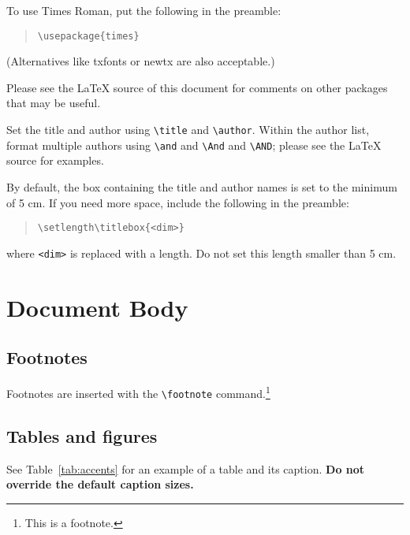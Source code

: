 \documentclass[11pt]{article}
\begin{document}
To use Times Roman, put the following in the preamble:
\begin{quote}
  \begin{verbatim}
\usepackage{times}
\end{verbatim}
\end{quote}
(Alternatives like txfonts or newtx are also acceptable.)

Please see the \LaTeX{} source of this document for comments on other packages that may be useful.

Set the title and author using \verb|\title| and \verb|\author|. Within the author list, format multiple authors using \verb|\and| and \verb|\And| and \verb|\AND|; please see the \LaTeX{} source for examples.

By default, the box containing the title and author names is set to the minimum of 5 cm. If you need more space, include the following in the preamble:
\begin{quote}
  \begin{verbatim}
\setlength\titlebox{<dim>}
\end{verbatim}
\end{quote}
where \verb|<dim>| is replaced with a length. Do not set this length smaller than 5 cm.

\section{Document Body}

\subsection{Footnotes}

Footnotes are inserted with the \verb|\footnote| command.\footnote{This is a footnote.}

\subsection{Tables and figures}

See Table~\ref{tab:accents} for an example of a table and its caption.
\textbf{Do not override the default caption sizes.}
\end{document}
